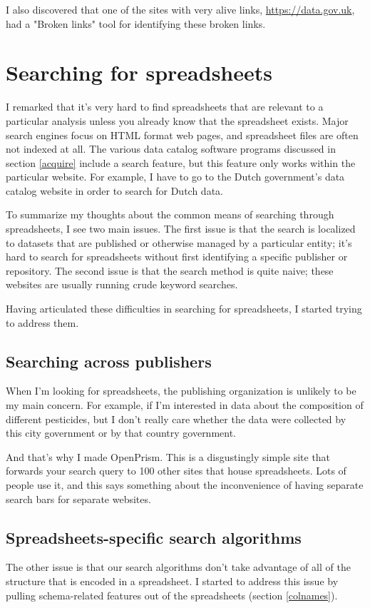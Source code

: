 \documentclass{acm_proc_article-sp}
\begin{document}
I also discovered that one of the sites with very alive links,
\url{https://data.gov.uk}, had a "Broken links" tool for identifying these
broken links.

\section{Searching for spreadsheets}
I remarked that it's very hard to find spreadsheets that are relevant
to a particular analysis unless you already know that the spreadsheet exists.
Major search engines focus on HTML format web pages, and spreadsheet files
are often not indexed at all. The various data catalog software programs
discussed in section \ref{acquire} include a search feature, but this feature
only works within the particular website. For example, I have to go to the
Dutch government's data catalog website in order to search for Dutch data.

To summarize my thoughts about the common means of searching through
spreadsheets, I see two main issues.
The first issue is that the search is localized to datasets that are published
or otherwise managed by a particular entity; it's hard to search for
spreadsheets without first identifying a specific publisher or repository.
The second issue is that the search method is quite naive; these websites are
usually running crude keyword searches.

Having articulated these difficulties in searching for spreadsheets, I started
trying to address them.

\subsection{Searching across publishers}
When I'm looking for spreadsheets, the publishing organization is unlikely
to be my main concern. For example, if I'm interested in data about the
composition of different pesticides, but I don't really care whether the
data were collected by this city government or by that country government.

And that's why I made OpenPrism. This is a disgustingly simple site that
forwards your search query to 100 other sites that house spreadsheets.
Lots of people use it, and this says something about the inconvenience of
having separate search bars for separate websites.

\subsection{Spreadsheets-specific search algorithms}
The other issue is that our search algorithms don't take advantage of all
of the structure that is encoded in a spreadsheet.
I started to address this issue by pulling schema-related features out
of the spreadsheets (section \ref{colnames}).
\end{document}
